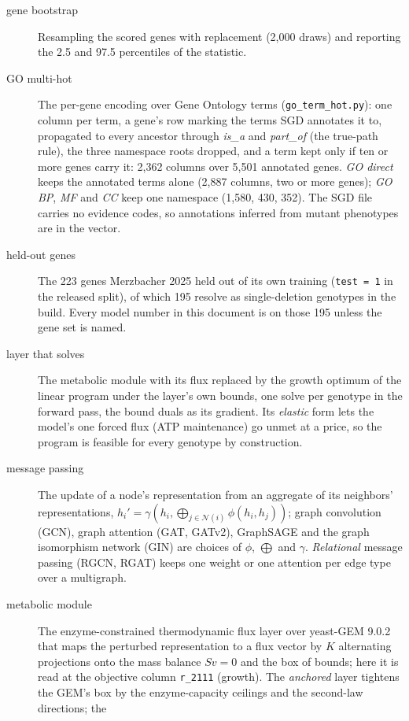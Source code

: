 \begin{description}
  \item[gene bootstrap] Resampling the scored genes with replacement (2,000 draws) and
    reporting the 2.5 and 97.5 percentiles of the statistic.
  \item[GO multi-hot] The per-gene encoding over Gene Ontology terms
    (\texttt{go\_term\_hot.py}): one column per term, a gene's row marking the terms SGD
    annotates it to, propagated to every ancestor through \emph{is\_a} and
    \emph{part\_of} (the true-path rule), the three namespace roots dropped, and a term
    kept only if ten or more genes carry it: 2,362 columns over 5,501 annotated genes.
    \emph{GO direct} keeps the annotated terms alone (2,887 columns, two or more genes);
    \emph{GO BP}, \emph{MF} and \emph{CC} keep one namespace (1,580, 430, 352). The SGD
    file carries no evidence codes, so annotations inferred from mutant phenotypes are
    in the vector.
  \item[held-out genes] The 223 genes Merzbacher 2025 held out of its own training
    (\texttt{test = 1} in the released split), of which 195 resolve as single-deletion
    genotypes in the build. Every model number in this document is on those 195 unless
    the gene set is named.
  \item[layer that solves] The metabolic module with its flux replaced by the growth
    optimum of the linear program under the layer's own bounds, one solve per genotype
    in the forward pass, the bound duals as its gradient. Its \emph{elastic} form lets
    the model's one forced flux (ATP maintenance) go unmet at a price, so the program is
    feasible for every genotype by construction.
  \item[message passing] The update of a node's representation from an aggregate of its
    neighbors' representations, $h_i' = \gamma(h_i, \bigoplus_{j \in \mathcal{N}(i)}
    \phi(h_i, h_j))$; graph convolution (GCN), graph attention (GAT, GATv2), GraphSAGE
    and the graph isomorphism network (GIN) are choices of $\phi$, $\bigoplus$ and
    $\gamma$. \emph{Relational} message passing (RGCN, RGAT) keeps one weight or one
    attention per edge type over a multigraph.
  \item[metabolic module] The enzyme-constrained thermodynamic flux layer over yeast-GEM
    9.0.2 that maps the perturbed representation to a flux vector by $K$ alternating
    projections onto the mass balance $Sv = 0$ and the box of bounds; here it is read at
    the objective column \texttt{r\_2111} (growth). The \emph{anchored} layer tightens the
    GEM's box by the enzyme-capacity ceilings and the second-law directions; the

\end{description}
